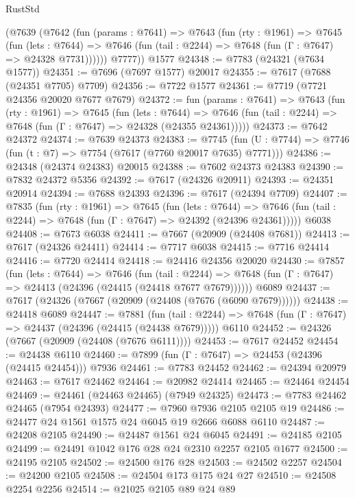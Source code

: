 \begin{lexlean}{RustStd}
\begin{coremodule}
      (@7639
        (@7642
          (fun (params : @7641) =>
          @7643
            (fun (rty : @1961) =>
            @7645
              (fun (lets : @7644) =>
              @7646 (fun (tail : @2244) => @7648 (fun (Γ : @7647) => @24328 @7731))))))
        @7777))
    @1577
@24348 := @7783 (@24321 (@7634 @1577))
@24351 := @7696 (@7697 @1577) @20017
@24355 := @7617 (@7688 (@24351 @7705) @7709)
@24356 := @7722 @1577
@24361 := @7719 (@7721 @24356 @20020 @7677 @7679)
@24372 := fun (params : @7641) =>
  @7643
    (fun (rty : @1961) =>
    @7645
      (fun (lets : @7644) =>
      @7646 (fun (tail : @2244) => @7648 (fun (Γ : @7647) => @24328 (@24355 @24361)))))
@24373 := @7642 @24372
@24374 := @7639 @24373
@24383 := @7745
    (fun (U : @7744) => @7746 (fun (t : @7) => @7754 (@7617 (@7760 @20017 @7635) @7771)))
@24386 := @24348 (@24374 @24383) @20015
@24388 := @7602 @24373 @24383
@24390 := @7832 @24372 @5356
@24392 := @7617 (@24326 @20911)
@24393 := @24351 @20914
@24394 := @7688 @24393
@24396 := @7617 (@24394 @7709)
@24407 := @7835
    (fun (rty : @1961) =>
    @7645
      (fun (lets : @7644) =>
      @7646 (fun (tail : @2244) => @7648 (fun (Γ : @7647) => @24392 (@24396 @24361)))))
    @6038
@24408 := @7673 @6038
@24411 := @7667 (@20909 (@24408 @7681))
@24413 := @7617 (@24326 @24411)
@24414 := @7717 @6038
@24415 := @7716 @24414
@24416 := @7720 @24414
@24418 := @24416 @24356 @20020
@24430 := @7857
    (fun (lets : @7644) =>
    @7646
      (fun (tail : @2244) =>
      @7648 (fun (Γ : @7647) => @24413 (@24396 (@24415 (@24418 @7677 @7679))))))
    @6089
@24437 := @7617 (@24326 (@7667 (@20909 (@24408 (@7676 (@6090 @7679))))))
@24438 := @24418 @6089
@24447 := @7881
    (fun (tail : @2244) => @7648 (fun (Γ : @7647) => @24437 (@24396 (@24415 (@24438 @7679)))))
    @6110
@24452 := @24326 (@7667 (@20909 (@24408 (@7676 @6111))))
@24453 := @7617 @24452
@24454 := @24438 @6110
@24460 := @7899 (fun (Γ : @7647) => @24453 (@24396 (@24415 @24454))) @7936
@24461 := @7783 @24452
@24462 := @24394 @20979
@24463 := @7617 @24462
@24464 := @20982 @24414
@24465 := @24464 @24454
@24469 := @24461 (@24463 @24465) (@7949 @24325)
@24473 := @7783 @24462 @24465 (@7954 @24393)
@24477 := @7960 @7936 @2105 @2105 @19
@24486 := @24477 @24 @1561 @1575 @24 @6045 @19 @2666 @6088 @6110
@24487 := @24208 @2105
@24490 := @24487 @1561 @24 @6045
@24491 := @24185 @2105
@24499 := @24491 @1042 @176 @28 @24 @2310 @2257 @2105 @1677
@24500 := @24195 @2105
@24502 := @24500 @176 @28
@24503 := @24502 @2257
@24504 := @24200 @2105
@24508 := @24504 @173 @175 @24 @27
@24510 := @24508 @2254 @2256
@24514 := @21025 @2105 @89 @24 @89

\end{coremodule}
\end{lexlean}
